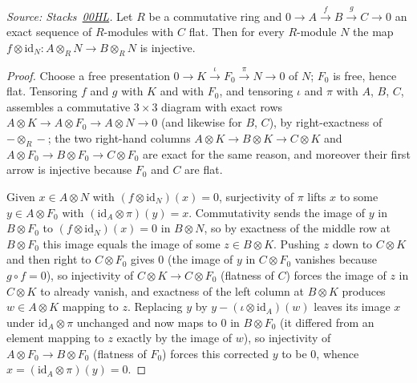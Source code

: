 \begin{lemma}
  \label{lem:flat_cokernel_rTensor_injective}
  \textit{Source: Stacks~\href{https://stacks.math.columbia.edu/tag/00HL}{00HL}.}
  Let \(R\) be a commutative ring and \(0 \to A \xrightarrow{f} B
  \xrightarrow{g} C \to 0\) an exact sequence of \(R\)-modules with \(C\)
  flat. Then for every \(R\)-module \(N\) the map
  \(f \otimes \mathrm{id}_N : A \otimes_R N \to B \otimes_R N\) is injective.
\end{lemma}
\begin{proof}\leanok
  Choose a free presentation \(0 \to K \xrightarrow{\iota} F_0
  \xrightarrow{\pi} N \to 0\) of \(N\); \(F_0\) is free, hence flat.
  Tensoring \(f\) and \(g\) with \(K\) and with \(F_0\), and tensoring
  \(\iota\) and \(\pi\) with \(A\), \(B\), \(C\), assembles a commutative
  \(3 \times 3\) diagram with exact rows
  \(A \otimes K \to A \otimes F_0 \to A \otimes N \to 0\) (and likewise for
  \(B\), \(C\)), by right-exactness of \(- \otimes_R -\); the two right-hand
  columns \(A \otimes K \to B \otimes K \to C \otimes K\) and
  \(A \otimes F_0 \to B \otimes F_0 \to C \otimes F_0\) are exact for the
  same reason, and moreover their first arrow is injective because \(F_0\)
  and \(C\) are flat.

  Given \(x \in A \otimes N\) with \((f \otimes \mathrm{id}_N)(x) = 0\),
  surjectivity of \(\pi\) lifts \(x\) to some \(y \in A \otimes F_0\) with
  \((\mathrm{id}_A \otimes \pi)(y) = x\). Commutativity sends the image of
  \(y\) in \(B \otimes F_0\) to \((f \otimes \mathrm{id}_N)(x) = 0\) in
  \(B \otimes N\), so by exactness of the middle row at \(B \otimes F_0\)
  this image equals the image of some \(z \in B \otimes K\). Pushing \(z\)
  down to \(C \otimes K\) and then right to \(C \otimes F_0\) gives \(0\)
  (the image of \(y\) in \(C \otimes F_0\) vanishes because
  \(g \circ f = 0\)), so injectivity of \(C \otimes K \to C \otimes F_0\)
  (flatness of \(C\)) forces the image of \(z\) in \(C \otimes K\) to
  already vanish, and exactness of the left column at \(B \otimes K\)
  produces \(w \in A \otimes K\) mapping to \(z\). Replacing \(y\) by
  \(y - (\iota \otimes \mathrm{id}_A)(w)\) leaves its image \(x\) under
  \(\mathrm{id}_A \otimes \pi\) unchanged and now maps to \(0\) in
  \(B \otimes F_0\) (it differed from an element mapping to \(z\) exactly by
  the image of \(w\)), so injectivity of \(A \otimes F_0 \to B \otimes F_0\)
  (flatness of \(F_0\)) forces this corrected \(y\) to be \(0\), whence
  \(x = (\mathrm{id}_A \otimes \pi)(y) = 0\).
\end{proof}

